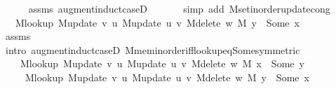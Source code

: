 \begin{isabellebody}
\ \ \ \ \isamarkupfalse%
\ assms\ augment{\isacharunderscore}{\kern0pt}induct{\isacharunderscore}{\kern0pt}case{\isacharunderscore}{\kern0pt}{}D{\isacharparenleft}{\kern0pt}{}{}{\isacharcomma}{\kern0pt}\ {}{}{\isacharparenright}{\kern0pt}\isanewline
\ \ \ \ \isamarkupfalse%
\ {\isacharparenleft}{\kern0pt}simp\ add{\isacharcolon}{\kern0pt}\ M{\isachardot}{\kern0pt}set{\isacharunderscore}{\kern0pt}inorder{\isacharunderscore}{\kern0pt}update{\isacharunderscore}{\kern0pt}cong{\isacharparenright}{\kern0pt}\isanewline
\ \ \isamarkupfalse%
\ \isamarkupfalse%
\ {\isachardoublequoteopen}{\isachardot}{\kern0pt}{\isachardot}{\kern0pt}{\isachardot}{\kern0pt}\ {\isasymlongleftrightarrow}\ M{\isacharunderscore}{\kern0pt}lookup\ {\isacharparenleft}{\kern0pt}M{\isacharunderscore}{\kern0pt}update\ v\ u\ {\isacharparenleft}{\kern0pt}M{\isacharunderscore}{\kern0pt}update\ u\ v\ {\isacharparenleft}{\kern0pt}M{\isacharunderscore}{\kern0pt}delete\ w\ M{\isacharparenright}{\kern0pt}{\isacharparenright}{\kern0pt}{\isacharparenright}{\kern0pt}\ y\ {\isacharequal}{\kern0pt}\ Some\ x{\isachardoublequoteclose}\isanewline
\ \ \ \ \isamarkupfalse%
\ assms\isanewline
\ \ \ \ \isamarkupfalse%
\ {\isacharparenleft}{\kern0pt}intro\ augment{\isacharunderscore}{\kern0pt}induct{\isacharunderscore}{\kern0pt}case{\isacharunderscore}{\kern0pt}{}D{\isacharparenleft}{\kern0pt}{}{}{\isacharparenright}{\kern0pt}\ M{\isachardot}{\kern0pt}mem{\isacharunderscore}{\kern0pt}inorder{\isacharunderscore}{\kern0pt}iff{\isacharunderscore}{\kern0pt}lookup{\isacharunderscore}{\kern0pt}eq{\isacharunderscore}{\kern0pt}Some{\isacharbrackleft}{\kern0pt}symmetric{\isacharbrackright}{\kern0pt}{\isacharparenright}{\kern0pt}\isanewline
\ \ \isamarkupfalse%
\ \isamarkupfalse%
\isanewline
\ \ \ \ {\isachardoublequoteopen}M{\isacharunderscore}{\kern0pt}lookup\ {\isacharparenleft}{\kern0pt}M{\isacharunderscore}{\kern0pt}update\ v\ u\ {\isacharparenleft}{\kern0pt}M{\isacharunderscore}{\kern0pt}update\ u\ v\ {\isacharparenleft}{\kern0pt}M{\isacharunderscore}{\kern0pt}delete\ w\ M{\isacharparenright}{\kern0pt}{\isacharparenright}{\kern0pt}{\isacharparenright}{\kern0pt}\ x\ {\isacharequal}{\kern0pt}\ Some\ y\ {\isasymlongleftrightarrow}\isanewline
\ \ \ \ \ M{\isacharunderscore}{\kern0pt}lookup\ {\isacharparenleft}{\kern0pt}M{\isacharunderscore}{\kern0pt}update\ v\ u\ {\isacharparenleft}{\kern0pt}M{\isacharunderscore}{\kern0pt}update\ u\ v\ {\isacharparenleft}{\kern0pt}M{\isacharunderscore}{\kern0pt}delete\ w\ M{\isacharparenright}{\kern0pt}{\isacharparenright}{\kern0pt}{\isacharparenright}{\kern0pt}\ y\ {\isacharequal}{\kern0pt}\ Some\ x{\isachardoublequoteclose}\isanewline

\end{isabellebody}
